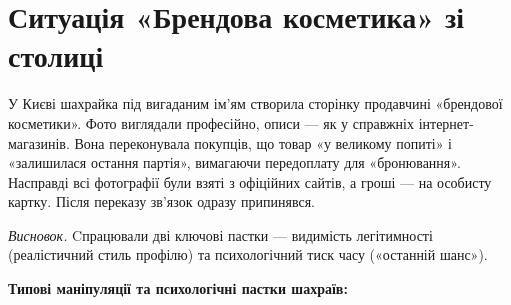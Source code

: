 \vspace{0.3cm}
\section{Ситуація «Брендова косметика» зі столиці}

У Києві шахрайка під вигаданим ім’ям створила сторінку продавчині «брендової косметики». Фото виглядали професійно, описи — як у справжніх інтернет-магазинів. Вона переконувала покупців, що товар «у великому попиті» і «залишилася остання партія», вимагаючи передоплату для «бронювання». Насправді всі фотографії були взяті з офіційних сайтів, а гроші — на особисту картку. Після переказу зв’язок одразу припинявся.

\textit{Висновок.} Cпрацювали дві ключові пастки — видимість легітимності (реалістичний стиль профілю) та психологічний тиск часу («останній шанс»).

\newpage

\noindent\textbf{Типові маніпуляції та психологічні пастки шахраїв:}

